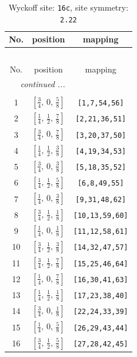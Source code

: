 \documentclass[fleqn,8pt]{jsarticle}
\begin{document}
\begin{longtable}{ccc}
\caption{Wyckoff site: {\tt 16c}, site symmetry: {\tt 2.22}}
 \\
 \hline \hline
No. & position & mapping \\ \hline \endfirsthead

\multicolumn{2}{l}{\tablename\ \thetable{}} \\
 \hline \hline
No. & position & mapping \\ \hline \endhead

 \hline \hline
\multicolumn{2}{r}{\footnotesize\it continued ...} \\ \endfoot

 \hline \hline
\multicolumn{2}{r}{} \\ \endlastfoot

1 & $\left[ \frac{3}{4},\, 0,\, \frac{5}{8} \right]$ & {\tt [1,7,54,56]} \\ \hline
2 & $\left[ \frac{1}{4},\, \frac{1}{2},\, \frac{7}{8} \right]$ & {\tt [2,21,36,51]} \\ \hline
3 & $\left[ \frac{3}{4},\, 0,\, \frac{7}{8} \right]$ & {\tt [3,20,37,50]} \\ \hline
4 & $\left[ \frac{1}{4},\, \frac{1}{2},\, \frac{3}{8} \right]$ & {\tt [4,19,34,53]} \\ \hline
5 & $\left[ \frac{3}{4},\, 0,\, \frac{3}{8} \right]$ & {\tt [5,18,35,52]} \\ \hline
6 & $\left[ \frac{1}{4},\, \frac{1}{2},\, \frac{5}{8} \right]$ & {\tt [6,8,49,55]} \\ \hline
7 & $\left[ \frac{1}{4},\, 0,\, \frac{3}{8} \right]$ & {\tt [9,31,48,62]} \\ \hline
8 & $\left[ \frac{3}{4},\, \frac{1}{2},\, \frac{1}{8} \right]$ & {\tt [10,13,59,60]} \\ \hline
9 & $\left[ \frac{1}{4},\, 0,\, \frac{1}{8} \right]$ & {\tt [11,12,58,61]} \\ \hline
10 & $\left[ \frac{3}{4},\, \frac{1}{2},\, \frac{3}{8} \right]$ & {\tt [14,32,47,57]} \\ \hline
11 & $\left[ \frac{3}{4},\, \frac{1}{2},\, \frac{7}{8} \right]$ & {\tt [15,25,46,64]} \\ \hline
12 & $\left[ \frac{1}{4},\, 0,\, \frac{7}{8} \right]$ & {\tt [16,30,41,63]} \\ \hline
13 & $\left[ \frac{1}{4},\, \frac{1}{2},\, \frac{1}{8} \right]$ & {\tt [17,23,38,40]} \\ \hline
14 & $\left[ \frac{3}{4},\, 0,\, \frac{1}{8} \right]$ & {\tt [22,24,33,39]} \\ \hline
15 & $\left[ \frac{1}{4},\, 0,\, \frac{5}{8} \right]$ & {\tt [26,29,43,44]} \\ \hline
16 & $\left[ \frac{3}{4},\, \frac{1}{2},\, \frac{5}{8} \right]$ & {\tt [27,28,42,45]} \\
\end{longtable}
\end{document}
